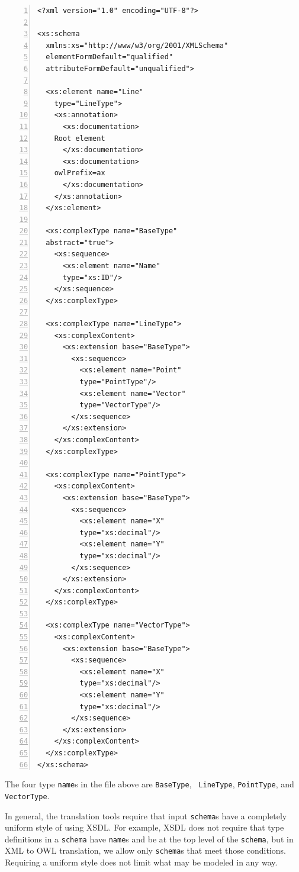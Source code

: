 \documentclass[preprint,12pt]{elsarticle}
\newenvironment{mylisting}
{\begin{list}{}{\setlength{\leftmargin}{1em}}\item\small}
{\end{list}}
\begin{document}
\begin{mylisting}
\begin{Verbatim}[commandchars=\\\{\},numbers=left, numbersep=1pt]
<?xml version="1.0" encoding="UTF-8"?>

<xs:schema 
  xmlns:xs="http://www/w3/org/2001/XMLSchema"
  elementFormDefault="qualified"
  attributeFormDefault="unqualified">
  
  <xs:element name="Line" 
    type="LineType">
    <xs:annotation>
      <xs:documentation>
	Root element
      </xs:documentation>
      <xs:documentation>
	owlPrefix=ax
      </xs:documentation>
    </xs:annotation>
  </xs:element>

  <xs:complexType name="BaseType"
  abstract="true">
    <xs:sequence>
      <xs:element name="Name"
      type="xs:ID"/>
    </xs:sequence>
  </xs:complexType>

  <xs:complexType name="LineType">
    <xs:complexContent>
      <xs:extension base="BaseType">
        <xs:sequence>
          <xs:element name="Point"
          type="PointType"/>
          <xs:element name="Vector"
          type="VectorType"/>
        </xs:sequence>
      </xs:extension>
    </xs:complexContent>
  </xs:complexType>

  <xs:complexType name="PointType">
    <xs:complexContent>
      <xs:extension base="BaseType">
        <xs:sequence>
          <xs:element name="X"
          type="xs:decimal"/>
          <xs:element name="Y"
          type="xs:decimal"/>
        </xs:sequence>
      </xs:extension>
    </xs:complexContent>
  </xs:complexType>

  <xs:complexType name="VectorType">
    <xs:complexContent>
      <xs:extension base="BaseType">
        <xs:sequence>
          <xs:element name="X"
          type="xs:decimal"/>
          <xs:element name="Y"
          type="xs:decimal"/>
        </xs:sequence>
      </xs:extension>
    </xs:complexContent>
  </xs:complexType>
</xs:schema>
\end{Verbatim}
\label{test1}
\end{mylisting}


The four type {\tt name}s in the file above are {\tt BaseType}, {\tt
  LineType}, {\tt PointType}, and {\tt VectorType}.

In general, the translation tools require that input {\tt schema}s have a
completely uniform style of using XSDL. For example, XSDL does not require
that type definitions in a {\tt schema} have {\tt name}s and be at the top
level of the {\tt schema}, but in XML to OWL translation, we allow only
{\tt schema}s that meet those conditions. Requiring a uniform style does
not limit what may be modeled in any way.
\end{document}
